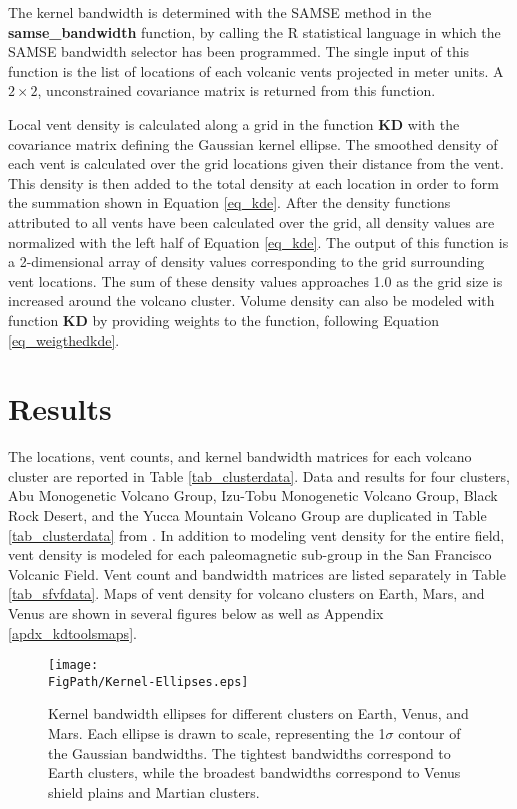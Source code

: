 The kernel bandwidth is determined with the SAMSE method in the \textbf{samse\_bandwidth} function, by calling the R statistical language in which the SAMSE bandwidth selector has been programmed. The single input of this function is the list of locations of each volcanic vents projected in meter units. A $2\times 2$, unconstrained covariance matrix is returned from this function.

Local vent density is calculated along a grid in the function \textbf{KD} with the covariance matrix defining the Gaussian kernel ellipse. The smoothed density of each vent is calculated over the grid locations given their distance from the vent. This density is then added to the total density at each location in order to form the summation shown in Equation \ref{eq_kde}. After the density functions attributed to all vents have been calculated over the grid, all density values are normalized with the left half of Equation \ref{eq_kde}. The output of this function is a 2-dimensional array of density values corresponding to the grid surrounding vent locations. The sum of these density values approaches 1.0 as the grid size is increased around the volcano cluster. Volume density can also be modeled with function \textbf{KD} by providing weights to the function, following Equation \ref{eq_weigthedkde}.

\section{Results}
The locations, vent counts, and kernel bandwidth matrices for each volcano cluster are reported in Table \ref{tab_clusterdata}. Data and results for four clusters, Abu Monogenetic Volcano Group, Izu-Tobu Monogenetic Volcano Group, Black Rock Desert, and the Yucca Mountain Volcano Group are duplicated in Table \ref{tab_clusterdata} from \citet{kiyosugi2012relationship}. In addition to modeling vent density for the entire field, vent density is modeled for each paleomagnetic sub-group in the San Francisco Volcanic Field. Vent count and bandwidth matrices are listed separately in Table \ref{tab_sfvfdata}. Maps of vent density for volcano clusters on Earth, Mars, and Venus are shown in several figures below as well as Appendix \ref{apdx_kdtoolsmaps}.

\begin{figure}
\centering
\texttt{[image: \\FigPath/Kernel-Ellipses.eps]}
\caption[Kernel bandwidth ellipses for different clusters on Earth, Venus, and Mars]{Kernel bandwidth ellipses for different clusters on Earth, Venus, and Mars. Each ellipse is drawn to scale, representing the 1$\sigma$ contour of the Gaussian bandwidths. The tightest bandwidths correspond to Earth clusters, while the broadest bandwidths correspond to Venus shield plains and Martian clusters.}
\label{fig_bandwidths}
\end{figure}

